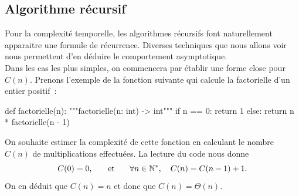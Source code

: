 \documentclass{magnolia}
\begin{document}
\subsection{Algorithme récursif}

Pour la complexité temporelle, les algorithmes récursifs font naturellement apparaitre
une formule de récurrence. Diverses techniques que nous allons voir nous permettent
d'en déduire le comportement asymptotique.\\

Dans les cas les plus simples, on commencera par établir une forme close pour $C(n)$.
Prenons l'exemple de la fonction suivante qui calcule la factorielle d'un entier
positif~:
\begin{pythoncodeline}
def factorielle(n):
    """factorielle(n: int) -> int"""
    if n == 0:
        return 1
    else:
        return n * factorielle(n - 1)
\end{pythoncodeline}
On souhaite estimer la complexité de cette fonction en calculant le nombre $C(n)$ de
multiplications effectuées. La lecture du code nous donne
\[C(0)=0, \quad\quad\!\text{et}\quad\!\quad \forall n\in{\mathbb{N}^*},\quad C(n)=C(n-1)+1.\]
On en déduit que $C(n)=n$ et donc que $C(n)=\Theta(n)$.\\
\end{document}
